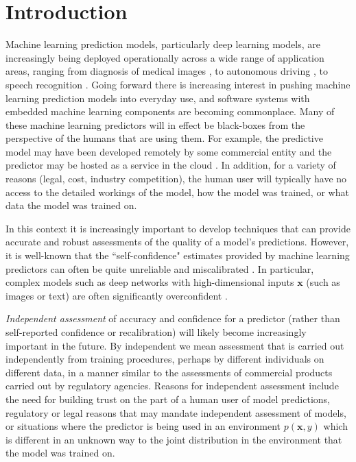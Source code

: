 \documentclass{article}
\newcommand{\ux}{{\mathbf{x}}}
\newcommand{\robby}[1]{\textcolor{Red}{[#1]\textsubscript{Robby}}}
\begin{document}
\section{Introduction}

Machine learning prediction models, particularly deep learning models, are increasingly being deployed operationally across a wide range of application areas,  ranging from diagnosis of medical images \cite{kermany2018identifying}, to autonomous driving \cite{du2017fused}, to speech recognition \cite{hinton2012deep}.
Going forward there is increasing interest in pushing machine learning prediction models into everyday use, and software systems with embedded machine learning components are becoming commonplace.
Many of these machine learning predictors will in effect be black-boxes from the perspective of  the humans that are using them. For example, the predictive model may have been developed remotely by some commercial entity  and the predictor may be hosted as a  service in the cloud  \cite{sanyal2018tapas}.
In addition, for a variety of reasons (legal, cost, industry competition), the human user will typically have no access to the detailed workings of the model, how the model was trained, or what data the model was trained on.

In this context it is increasingly important to develop techniques that can provide accurate and robust assessments of the quality of a model's predictions.
However, it is well-known that the ``self-confidence" estimates provided by machine learning predictors can often be quite unreliable and miscalibrated \cite{zadrozny2002transforming,kull2017a}.
In particular, complex models such as deep networks with high-dimensional inputs $\ux$ (such as images or text) are often significantly overconfident \cite{gal2016dropout, guo2017calibration,lakshminarayanan2017simple,kuleshov2018accurate, keren2018calibrated}.

{\it Independent assessment} of accuracy and confidence for a predictor (rather than self-reported confidence or recalibration) will likely become increasingly important in the future.
By independent we mean assessment that is carried out independently from training procedures, perhaps by different individuals on different data, in a manner similar to the assessments of commercial products carried out by  regulatory agencies.
Reasons for independent assessment include the need for  building trust on the part of a human user of model predictions,  regulatory or legal reasons that may mandate independent assessment of models, or situations where the predictor is being used in an environment $p(\ux, y)$ which is different in an unknown way to the joint distribution in the environment that the model was trained on.
\end{document}

